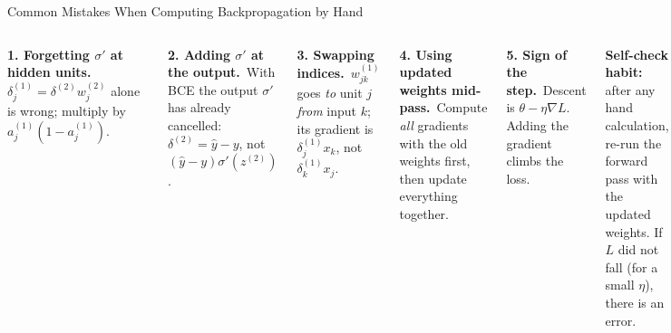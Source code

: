 \documentclass[aspectratio=169,10pt]{beamer}
\begin{document}
\begin{frame}{Common Mistakes When Computing Backpropagation by Hand}
\begin{columns}[T]
\begin{wbox}\textbf{1. Forgetting $\sigma'$ at hidden units.}\ \scriptsize $\delta^{(1)}_j=\delta^{(2)}w^{(2)}_j$ alone is wrong; multiply by $a^{(1)}_j(1-a^{(1)}_j)$.\end{wbox}
\begin{wbox}\textbf{2. Adding $\sigma'$ at the output.}\ \scriptsize With BCE the output $\sigma'$ has already cancelled: $\delta^{(2)}=\hat y-y$, not $(\hat y-y)\sigma'(z^{(2)})$.\end{wbox}
\begin{wbox}\textbf{3. Swapping indices.}\ \scriptsize $w^{(1)}_{jk}$ goes \emph{to} unit $j$ \emph{from} input $k$; its gradient is $\delta^{(1)}_j x_k$, not $\delta^{(1)}_k x_j$.\end{wbox}
\begin{wbox}\textbf{4. Using updated weights mid-pass.}\ \scriptsize Compute \emph{all} gradients with the old weights first, then update everything together.\end{wbox}
\begin{wbox}\textbf{5. Sign of the step.}\ \scriptsize Descent is $\theta-\eta\nabla L$. Adding the gradient climbs the loss.\end{wbox}
\begin{ibox}\scriptsize\textbf{Self-check habit:} after any hand calculation, re-run the forward pass with the updated weights. If $L$ did not fall (for a small $\eta$), there is an error.\end{ibox}
\end{columns}
\end{frame}
\end{document}
